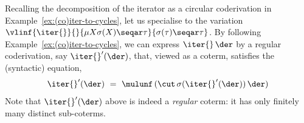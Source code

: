 \begin{example}
    \label{ex:iter-coder-as-coterm}
    Recalling the decomposition of the iterator as a circular coderivation in Example~\ref{ex:(co)iter-to-cycles}, let us specialise to the variation $    \vlinf{\iter{}}{}{\mu X \sigma(X)\seqar \tau}{\sigma(\tau)\seqar \tau}$.
 By following Example~\ref{ex:(co)iter-to-cycles}, we can express $\iter{}\, \der$
    by a regular coderivation, say $\iter{}'(\der)$, that, viewed as a coterm, satisfies the (syntactic) equation,
    \begin{equation}
        \label{eq:iter-coder-syntactic-eqn}
        \iter{}'(\der)\ = \ \mulunf\, (\cut\, \sigma(\iter{}'(\der))\, \der)
    \end{equation}
    Note that $\iter{}'(\der)$ above is indeed a \emph{regular} coterm: it has only finitely many distinct sub-coterms.
\end{example}





